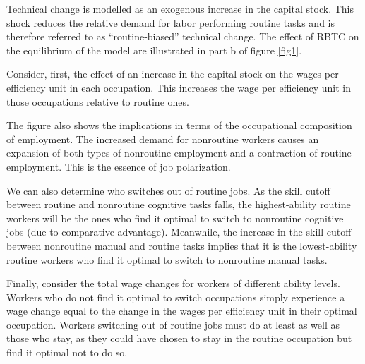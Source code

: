 \documentclass[12pt]{article}
\newcommand{\highlightP}[1]{{\emph{\color{MyPink}{#1}}}}
\theoremstyle{definition}
\begin{document}
Technical change is modelled as an exogenous increase in the capital stock. This shock reduces the relative demand for labor performing routine tasks and is therefore referred to as ``routine-biased'' technical change. The effect of RBTC on the equilibrium of the model are illustrated in part b of figure \ref{fig1}.

Consider, first, the effect of an increase in the capital stock on the wages per efficiency unit in each occupation. \highlightP{The immediate effect of the shock is to increase the relative demand for nonroutine cognitive tasks within the manufacturing sector due to the complementarities between routine and nonroutine cognitive task services.} This increases the wage per efficiency unit in those occupations relative to routine ones. \highlightP{Meanwhile, there is an increase in household income, which increases the demand for the the service good. This pushes up the wage per efficiency unit in the nonroutine manual occupation relative to the wages per efficiency unit in the other occupations.}

The figure also shows the implications in terms of the occupational composition of employment. The increased demand for nonroutine workers causes an expansion of both types of nonroutine employment and a contraction of routine employment. This is the essence of job polarization.

We can also determine who switches out of routine jobs. As the skill cutoff between routine and nonroutine cognitive tasks falls, the highest-ability routine workers will be the ones who find it optimal to switch to nonroutine cognitive jobs (due to comparative advantage). Meanwhile, the increase in the skill cutoff between nonroutine manual and routine tasks implies that it is the lowest-ability routine workers who find it optimal to switch to nonroutine manual tasks.

Finally, consider the total wage changes for workers of different ability levels. Workers who do not find it optimal to switch occupations simply experience a wage change equal to the change in the wages per efficiency unit in their optimal occupation. Workers switching out of routine jobs must do at least as well as those who stay, as they could have chosen to stay in the routine occupation but find it optimal not to do so.
\end{document}
